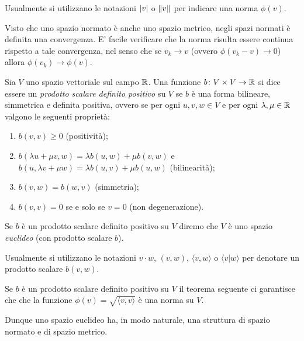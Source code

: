Usualmente si utilizzano le notazioni ${\left|v\right|}$ o ${\left\Vert v\right\Vert}$ per indicare
una norma $\phi(v)$.

Visto che uno spazio normato è anche uno spazio metrico, negli spazi
normati è definita una convergenza. E' facile verificare che la norma risulta
essere continua rispetto a tale convergenza, nel senso che se $v_k \to v$
(ovvero $\phi(v_k-v)\to 0$) allora $\phi(v_k)\to \phi(v)$.

\begin{definition}
\label{def:prodotto_scalare}%
Sia $V$ uno spazio vettoriale sul campo ${\mathbb R}$.
Una funzione $b\colon V\times V \to {\mathbb R}$ si dice
essere un \emph{prodotto scalare definito positivo}%
%
%
su $V$ se
$b$ è una forma bilineare, simmetrica e definita
positiva, ovvero se
per ogni $u,v,w\in V$ e per ogni $\lambda, \mu \in {\mathbb R}$
valgono le seguenti proprietà:
\begin{enumerate}
\item $b(v,v) \ge 0$ (positività);
\item $b(\lambda u + \mu v, w) = \lambda b(u,w) + \mu b(v,w)$
e $b(u,\lambda v+ \mu w) = \lambda b(u,v) + \mu b(u,w)$
(bilinearità);
\item $b(v,w) = b(w,v)$ (simmetria);
\item $b(v,v) = 0$ se e solo se $v=0$ (non degenerazione).
\end{enumerate}

Se $b$ è un prodotto scalare definito positivo su $V$ diremo che $V$ è uno
spazio \emph{euclideo} (con prodotto scalare $b$).

Usualmente si utilizzano le notazioni $v\cdot w$, $(v,w)$, $\langle v,w\rangle$
o $\langle v \vert w\rangle$ per denotare un prodotto scalare $b(v,w)$.
\end{definition}

Se $b$ è un prodotto scalare definito positivo su $V$ il teorema seguente ci garantisce che
che la funzione $\phi(v) = \sqrt{\langle v,v\rangle}$ è una norma su $V$.

Dunque uno spazio euclideo ha, in modo naturale, una struttura di spazio
normato e di spazio metrico.

